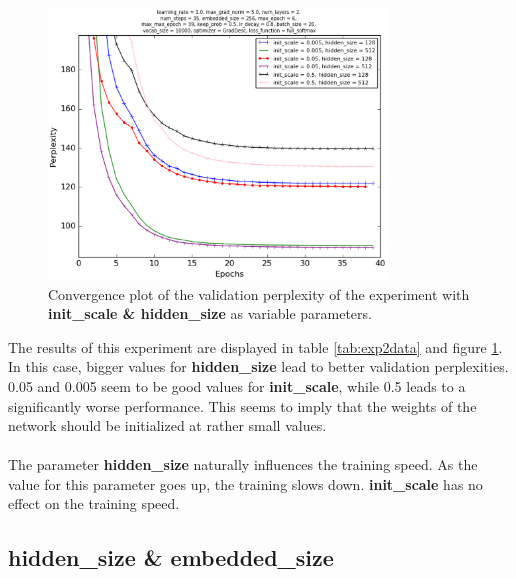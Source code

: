 \documentclass[10pt,a4paper,titlepage]{article}
\begin{document}
\begin{figure}[H]
	\begin{center}
		\includegraphics[width=0.80\textwidth]{Figures/inithiddenperf.eps}
		\caption{Convergence plot of the validation perplexity of the experiment with \textbf{init\_scale \& hidden\_size} as variable parameters. }
		\label{fig:exp2perf}
	\end{center}	
\end{figure}

The results of this experiment are displayed in table \ref{tab:exp2data} and figure \ref{fig:exp2perf}. In this case, bigger values for \textbf{hidden\_size} lead to better validation perplexities. 0.05 and 0.005 seem to be good values for \textbf{init\_scale}, while 0.5 leads to a significantly worse performance. This seems to imply that the weights of the network should be initialized at rather small values.\\
\\
The parameter \textbf{hidden\_size} naturally influences the training speed. As the value for this parameter goes up, the training slows down. \textbf{init\_scale} has no effect on the training speed.

\newpage

\subsection{hidden\_size \& embedded\_size}
\end{document}

